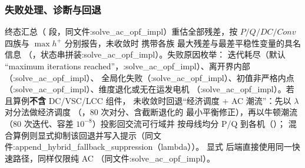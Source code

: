 \subsubsection*{失败处理、诊断与回退}
终态汇总（ 段，同文件:solve\_ac\_opf\_impl）重估全部残差，按
$P/Q/DC/Conv$ 四族与 $\max h^{+}$ 分别报告，未收敛时  携带各族
最大残差与最差平稳性变量的具名信息
（，状态串拼装:solve\_ac\_opf\_impl）。失败原因枚举：
迭代耗尽（默认 ``maximum iterations reached''，:solve\_ac\_opf\_impl）、离开界内部（:solve\_ac\_opf\_impl）、
全局化失败（:solve\_ac\_opf\_impl）、初值非严格内点（:solve\_ac\_opf\_impl）、维度退化或无在运发电机
（:solve\_ac\_opf\_impl）。若  且算例\textbf{不含} DC/VSC/LCC 组件，
未收敛时回退``经济调度 + AC 潮流''：先以 $\lambda$ 对分法做经济调度
（，80 次对分、含截断退化的
最小平衡修正），再以牛顿潮流（80 次迭代、容差 $10^{-8}$）投影回交流可行域并
按母线均分 P/Q 到各机（）；
混合算例则显式抑制该回退并写入提示（同文件:append\_hybrid\_fallback\_suppression（lambda））。
显式  后端直接使用同一快速路径，同样仅限纯 AC
（同文件:solve\_ac\_opf\_impl）。


